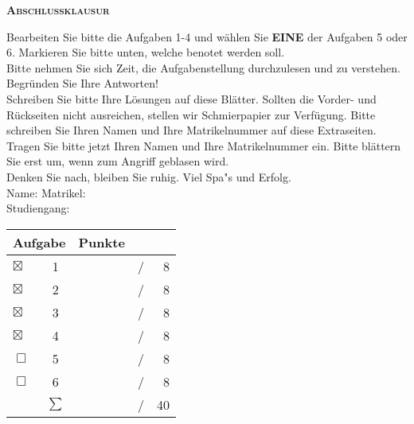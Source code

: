 \documentclass[a4paper]{article}
\begin{document}
% 

{
\kopf
}
 \begin{center}
   {\Large {\bfseries\scshape Abschlussklausur}}
\end{center}

\enlargethispage*{40mm}

Bearbeiten Sie bitte die Aufgaben 1-4 und w\"ahlen Sie {\bfseries
  \sffamily EINE} der Aufgaben 5 oder 6. Markieren Sie bitte unten,
welche benotet werden soll. 
\\
Bitte nehmen Sie sich Zeit, die Aufgabenstellung durchzulesen und zu
verstehen. Begr\"unden Sie Ihre Antworten!
\\
Schreiben Sie bitte Ihre L\"osungen auf diese Bl\"atter. 
Sollten die Vorder- und R\"uckseiten nicht ausreichen, stellen wir
Schmierpapier zur Verf\"ugung.
Bitte schreiben Sie Ihren Namen und Ihre Matrikelnummer auf diese
Extraseiten. 
\\
Tragen Sie bitte jetzt Ihren Namen und Ihre Matrikelnummer ein.
Bitte bl\"attern Sie erst um, wenn zum Angriff geblasen wird.
\\[\baselineskip] %
Denken Sie nach, bleiben Sie ruhig. Viel Spa"s und Erfolg.
\\[\baselineskip] %
Name: \underline{\hspace{50mm}} \hfill
\mbox{Matrikel: \underline{\hspace{40mm}}}
\\[.5\baselineskip]
\mbox{} \hfill \mbox{Studiengang: \underline{\hspace{40mm}}}
\\[\baselineskip] %
\begin{center}
  \begin{tabular}{l c | rcr}
    \multicolumn{2}{r|}{Aufgabe} & Punkte \\
    \hline
    $\boxtimes$ & 1 & & / & 8 \\
    $\boxtimes$ & 2 & & / & 8 \\
    $\boxtimes$ & 3 & & / & 8 \\
    $\boxtimes$ & 4 & & / & 8 \\
    $\Box$ & 5 & & / & 8 \\
    $\Box$ & 6 & & / & 8 \\
    \hline
    & $\sum$ & & / & 40
  \end{tabular}
\end{center}
\vfill
\end{document}
